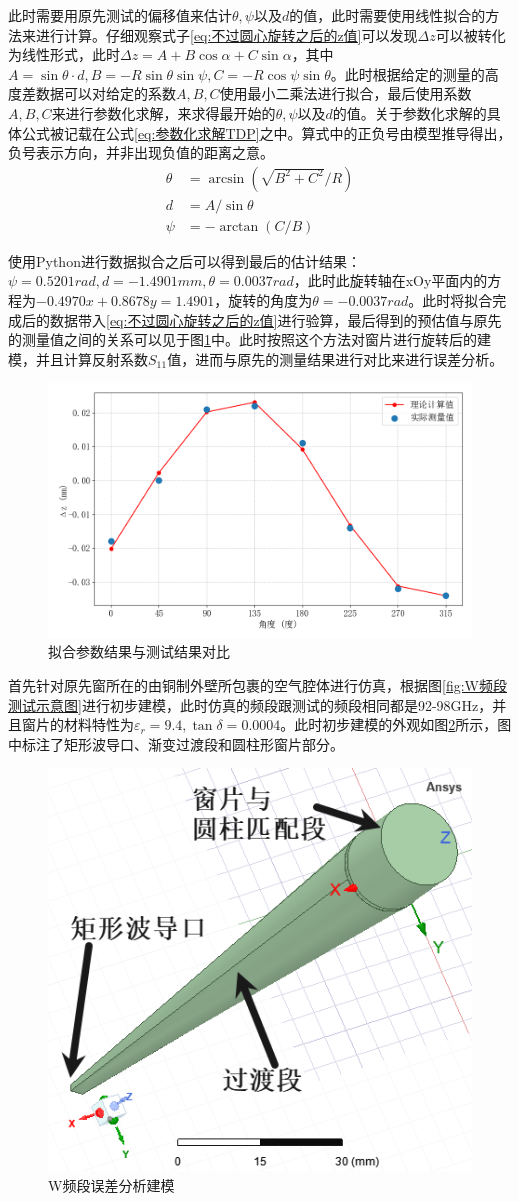 \documentclass[master]{thesis-uestc}
\begin{document}
此时需要用原先测试的偏移值来估计\(\theta, \psi\)以及\(d\)的值，此时需要使用线性拟合的方法来进行计算。仔细观察式子\ref{eq:不过圆心旋转之后的z值}可以发现\(\Delta z\)可以被转化为线性形式，此时\(\Delta z =A+B \cos \alpha +C \sin \alpha \)，其中\(A = \sin \theta \cdot d, B = -R \sin \theta \sin \psi, C = -R \cos \psi \sin \theta \)。此时根据给定的测量的高度差数据可以对给定的系数\(A, B, C\)使用最小二乘法进行拟合，最后使用系数\(A, B, C\)来进行参数化求解，来求得最开始的\(\theta, \psi\)以及\(d\)的值。关于参数化求解的具体公式被记载在公式\ref{eq:参数化求解TDP}之中。算式中的正负号由模型推导得出，负号表示方向，并非出现负值的距离之意。
\begin{subequations}\label{eq:参数化求解TDP}
    \begin{align}
        \theta &= \arcsin(\sqrt{B^2 + C^2}/R)  \label{eq:sin_theta}\\
        d &= A / \sin\theta  \\
        \psi &= - \arctan(C/B) 
    \end{align}
\end{subequations}

使用Python进行数据拟合之后可以得到最后的估计结果：\(\psi = 0.5201 rad, d = -1.4901 mm , \theta = 0.0037 rad\)，此时此旋转轴在xOy平面内的方程为\(-0.4970 x + 0.8678 y = 1.4901\)，旋转的角度为\(\theta = -0.0037 rad\)。此时将拟合完成后的数据带入\ref{eq:不过圆心旋转之后的z值}进行验算，最后得到的预估值与原先的测量值之间的关系可以见于图\ref{fig:测量z值与计算z值}中。此时按照这个方法对窗片进行旋转后的建模，并且计算反射系数\(S_{11}\)值，进而与原先的测量结果进行对比来进行误差分析。
\begin{figure}[!htb]
    \centering
    \includegraphics[width=0.35\linewidth]{pic/chapter5/不过圆心高度差拟合.png}
    \caption{拟合参数结果与测试结果对比}
    \label{fig:测量z值与计算z值}
\end{figure}

首先针对原先窗所在的由铜制外壁所包裹的空气腔体进行仿真，根据图\ref{fig:W频段测试示意图}进行初步建模，此时仿真的频段跟测试的频段相同都是92-98GHz，并且窗片的材料特性为\(\varepsilon_r = 9.4, \tan \delta = 0.0004\)。此时初步建模的外观如图\ref{fig:W波段误差分析建模}所示，图中标注了矩形波导口、渐变过渡段和圆柱形窗片部分。
\begin{figure}[!htb]
    \centering
    \includegraphics[width=0.25\linewidth]{pic/chapter5/W频段误差分析建模.png}
    \caption{W频段误差分析建模}
    \label{fig:W波段误差分析建模}
\end{figure}
\end{document}
